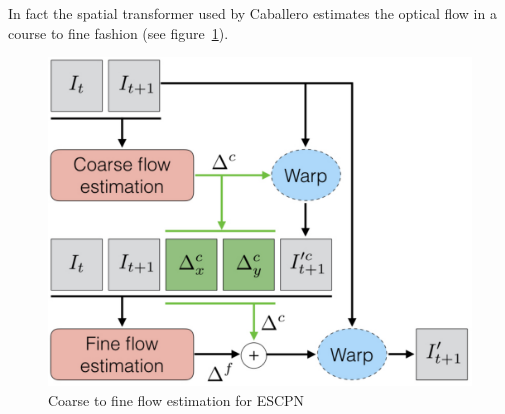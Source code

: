 %
In fact the spatial transformer used by Caballero \etal estimates the optical flow in a course to fine fashion (see figure~\ref{fig:motionestimation}).
\begin{figure}
    \centering
    \includegraphics[width=.49\textwidth]{figures/neural_networks/motion_compensation.png}
    \caption{Coarse to fine flow estimation for ESCPN \cite{caballero2017real}}\label{fig:motionestimation}
\end{figure}


